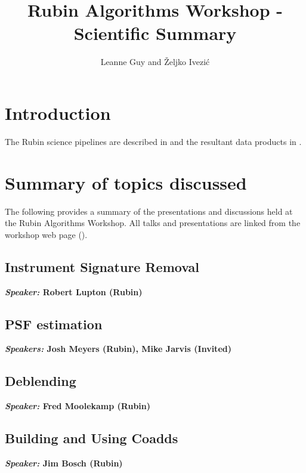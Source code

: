 \documentclass[DM,authoryear,toc]{lsstdoc}
\title{Rubin Algorithms Workshop - Scientific Summary}
\author{%
Leanne Guy and  \v{Z}eljko Ivezi\'{c}
}
\date{\vcsDate}
\begin{document}
\maketitle


\section{Introduction}
The Rubin science pipelines are described in  and the resultant data products in .

\section{Summary of topics discussed}
The following provides a summary of the presentations and discussions held at the Rubin Algorithms Workshop.
All talks and presentations are linked from the workshop web page (\cite{RAW2020}).


\subsection{Instrument Signature Removal}
 \textbf{ \textit{Speaker:} Robert Lupton (Rubin) } 

\subsection{PSF estimation}
 \textbf{ \textit{Speakers:} Josh Meyers (Rubin), Mike Jarvis (Invited) } 

\subsection{Deblending}
 \textbf{ \textit{Speaker:} Fred Moolekamp (Rubin) } 

\subsection{Building and Using Coadds}
 \textbf{ \textit{Speaker:} Jim Bosch (Rubin) } 
\end{document}
